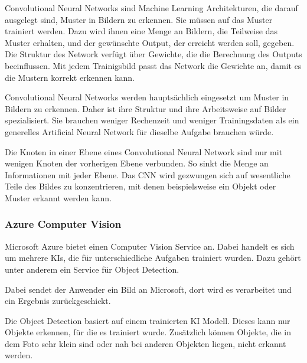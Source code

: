 Convolutional Neural Networks sind Machine Learning Architekturen, die darauf ausgelegt sind, Muster in Bildern zu erkennen. Sie müssen auf das Muster trainiert werden. Dazu wird ihnen eine Menge an Bildern, die Teilweise das Muster erhalten, und der gewünschte Output, der erreicht werden soll, gegeben. Die Struktur des Network verfügt über Gewichte, die die Berechnung des Outputs beeinflussen. Mit jedem Trainigsbild passt das Network die Gewichte an, damit es die Mustern korrekt erkennen kann.\citep{introToCNN,surveyOfDeepLearing}

Convolutional Neural Networks werden hauptsächlich eingesetzt um Muster in Bildern zu erkennen. Daher ist ihre Struktur und ihre Arbeitsweise auf Bilder spezialisiert. Sie brauchen weniger Rechenzeit und weniger Trainingsdaten als ein generelles Artificial Neural Network für dieselbe Aufgabe brauchen würde.\citep{introToCNN,surveyOfDeepLearing,cNNforClass} 

Die Knoten in einer Ebene eines Convolutional Neural Network sind nur mit wenigen Knoten der vorherigen Ebene verbunden. So sinkt die Menge an Informationen mit jeder Ebene. Das CNN wird gezwungen sich auf wesentliche Teile des Bildes zu konzentrieren, mit denen beispielsweise ein Objekt oder  Muster erkannt werden kann. \citep{introToCNN,surveyOfDeepLearing}


\subsubsection{Azure Computer Vision}
Microsoft Azure bietet einen Computer Vision Service an. Dabei handelt es sich um mehrere KIs, die für unterschiedliche Aufgaben trainiert wurden. Dazu gehört unter anderem ein Service für Object Detection.

Dabei sendet der Anwender ein Bild an Microsoft, dort wird es verarbeitet und ein Ergebnis zurückgeschickt.\citep{getAzure,whatIsAzure,objDetectAzure,Azure302Doc}

Die Object Detection basiert auf einem trainierten KI Modell. Dieses kann nur Objekte erkennen, für die es trainiert wurde.
Zusätzlich können Objekte, die in dem Foto sehr klein sind oder nah bei anderen Objekten liegen, nicht erkannt werden.\citep{azureobjdetec}


